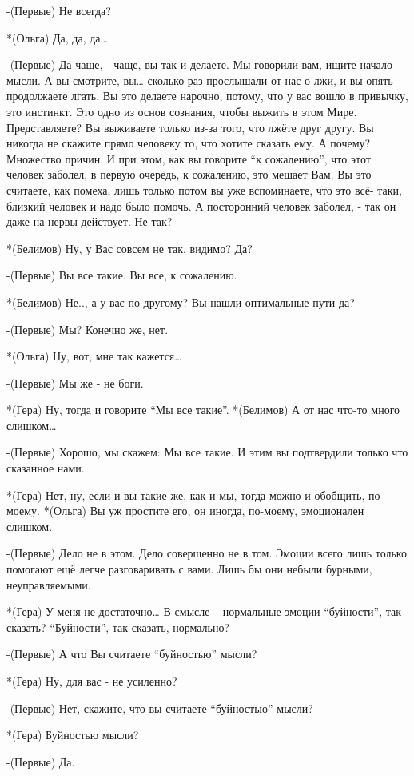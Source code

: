 -(Первые) Не всегда?

*(Ольга) Да, да, да…

-(Первые) Да чаще, - чаще, вы так и делаете. Мы говорили вам, ищите начало мысли. А вы смотрите, вы… сколько раз прослышали от нас о лжи, и вы опять продолжаете лгать. Вы это делаете нарочно, потому, что у вас вошло в привычку, это инстинкт. Это одно из основ сознания, чтобы выжить в этом Мире. Представляете? Вы выживаете только из-за того, что лжёте друг другу. Вы никогда не скажите прямо человеку то, что хотите сказать ему. А почему? Множество причин. И при этом, как вы говорите “к сожалению”, что этот человек заболел, в первую очередь, к сожалению, это мешает Вам. Вы это считаете, как помеха, лишь только потом вы уже вспоминаете, что это всё- таки,  близкий человек  и надо было помочь. А посторонний человек заболел, - так он даже на нервы действует. Не так?

*(Белимов) Ну, у Вас совсем не так, видимо? Да?

-(Первые) Вы все такие. Вы все, к сожалению.

*(Белимов) Не.., а у вас по-другому? Вы нашли оптимальные пути да?

-(Первые) Мы? Конечно же, нет. 

*(Ольга) Ну, вот, мне так кажется…

-(Первые) Мы же - не боги.

*(Гера) Ну, тогда и говорите “Мы все такие”.
*(Белимов) А от нас что-то много слишком…

-(Первые) Хорошо, мы скажем: Мы все такие. И этим вы подтвердили только что сказанное нами.

*(Гера) Нет, ну, если и вы такие же, как и мы, тогда можно и обобщить, по-моему.
*(Ольга) Вы уж простите его, он иногда, по-моему, эмоционален слишком.

-(Первые) Дело не в этом. Дело совершенно не в том. Эмоции  всего лишь только помогают ещё легче разговаривать с вами. Лишь бы они небыли бурными, неуправляемыми.

*(Гера) У меня не достаточно… В смысле – нормальные эмоции “буйности”, так сказать?  “Буйности”, так сказать, нормально?

-(Первые) А что Вы считаете “буйностью” мысли?

*(Гера) Ну, для вас - не усиленно?

-(Первые) Нет, скажите, что вы считаете “буйностью” мысли?

*(Гера) Буйностью мысли?

-(Первые) Да.

